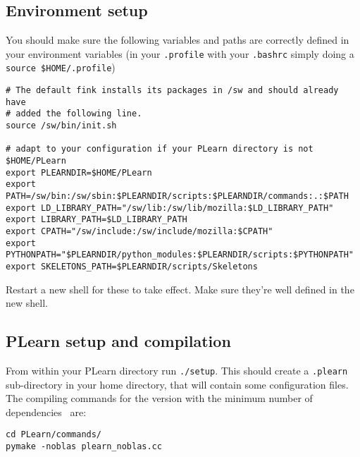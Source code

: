 \documentclass[11pt]{book}
\begin{document}



\subsection{Environment setup}

You should make sure the following variables and paths are correctly defined in your
environment variables (in your {\tt .profile} with your {\tt .bashrc}
simply doing a \verb!source $HOME/.profile!)

\begin{verbatim}
# The default fink installs its packages in /sw and should already have
# added the following line.
source /sw/bin/init.sh

# adapt to your configuration if your PLearn directory is not $HOME/PLearn
export PLEARNDIR=$HOME/PLearn
export PATH=/sw/bin:/sw/sbin:$PLEARNDIR/scripts:$PLEARNDIR/commands:.:$PATH
export LD_LIBRARY_PATH="/sw/lib:/sw/lib/mozilla:$LD_LIBRARY_PATH"
export LIBRARY_PATH=$LD_LIBRARY_PATH
export CPATH="/sw/include:/sw/include/mozilla:$CPATH"
export PYTHONPATH="$PLEARNDIR/python_modules:$PLEARNDIR/scripts:$PYTHONPATH"
export SKELETONS_PATH=$PLEARNDIR/scripts/Skeletons
\end{verbatim}

Restart a new shell for these to take effect. Make sure they're well
defined in the new shell.

\subsection{PLearn setup and compilation}

From within your PLearn directory run {\tt ./setup}. This should create a
{\tt .plearn} sub-directory in your home directory, that will contain some
configuration files.
The compiling commands for the version with the minimum number of dependencies \
are:
\begin{verbatim}
cd PLearn/commands/
pymake -noblas plearn_noblas.cc
\end{verbatim}
\end{document}
